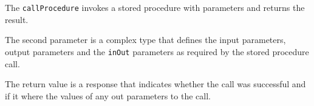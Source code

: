 The \verb+callProcedure+ invokes a stored procedure with parameters and returns the result.

The second parameter is a complex type that defines the input parameters, output parameters and the \verb+inOut+ parameters as required by the
stored procedure call.

The return value is a response that indicates whether the call was successful and if it where the values of any out parameters to the call.
